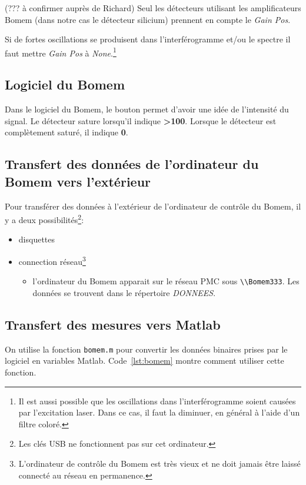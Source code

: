 \documentclass[11pt,francais]{book} %
\begin{document}
(??? à confirmer auprès de Richard) Seul les détecteurs utilisant les amplificateurs Bomem (dans notre cas le détecteur silicium) prennent en compte le {\it Gain Pos}.

Si de fortes oscillations se produisent dans l'interférogramme et/ou le spectre il faut mettre {\it Gain Pos} à {\it None}.\footnote{Il est aussi possible que les oscillations dans l'interférogramme soient causées par l'excitation laser. Dans ce cas, il faut la diminuer, en général à l'aide d'un filtre coloré.} 
 
\subsection{Logiciel du Bomem}

Dans le logiciel du Bomem, le bouton  permet d'avoir une idée de l'intensité du signal.
Le détecteur sature lorsqu'il indique {\bf >100}.
Lorsque le détecteur est complètement saturé, il indique {\bf 0}.

\subsection{Transfert des données de l'ordinateur du Bomem vers l'extérieur}

Pour transférer des données à l'extérieur de l'ordinateur de contrôle du Bomem, il y a deux possibilités\footnote{Les clés USB ne fonctionnent pas sur cet ordinateur.}:
\begin{itemize}
\item disquettes
\item connection réseau\footnote{L'ordinateur de contrôle du Bomem est très vieux et ne doit jamais être laissé connecté au réseau en permanence.}
  \begin{itemize}
    \item l'ordinateur du Bomem apparait sur le réseau PMC sous \verb!\\Bomem333!. Les données se trouvent dans le répertoire {\it DONNEES}.
    \end{itemize}
\end{itemize}



\subsection{Transfert des mesures vers Matlab}

On utilise la fonction \verb!bomem.m! pour convertir les données binaires prises par le logiciel en variables Matlab.
Code~\ref{lst:bomem} montre comment utiliser cette fonction.
\end{document}
